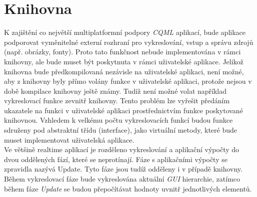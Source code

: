 \documentclass[11pt,twoside,a4paper]{book}
\begin{document}
\section{\label{SEC:libI}Knihovna}
K zajištění co největší multiplatformní podpory \textit{CQML} aplikací, bude aplikace podporovat vyměnitelné externí rozhraní pro vykreslování, vstup a správu zdrojů (např. obrázky, fonty). Proto tato funkčnost nebude implementována v rámci knihovny, ale bude muset být poskytnuta v rámci uživatelské aplikace. 
Jelikož knihovna bude předkompilovaná nezávisle na uživatelské aplikaci, není možné, aby z knihovny byly přímo volány funkce v uživatelské aplikaci, protože nejsou v době kompilace knihovny ještě známy. Tudíž není možné volat například vykreslovací funkce zevnitř knihovny. Tento problém lze vyřešit předáním ukazatele na funkci v uživatelské aplikaci prostřednictvím funkce poskytované knihovnou. Vzhledem k velkému počtu vykreslovacích funkcí budou funkce sdruženy pod abstraktní třídu (interface), jako virtuální metody, které bude muset implementovat uživatelská aplikace.\\

Ve většině realtime aplikací je rozděleno vykreslování a aplikační výpočty do dvou oddělených fází, které se neprotínají. Fáze s aplikačními výpočty se zpravidla nazývá Update. Tyto fáze jsou tudíž odděleny i v případě knihovny. Během vykreslovací fáze bude vykreslována aktuální \textit{GUI} hierarchie, zatímco během fáze \textit{Update} se budou přepočítávat hodnoty uvnitř jednotlivých elementů.\\
\end{document}

